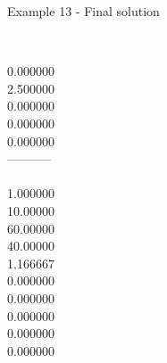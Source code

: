 \begin{frame}{Example 13 - Final solution}
\begin{columns}[t]
\begin{column}{0.3\textwidth}
\\
0.000000\\
2.500000\\
0.000000\\
0.000000\\
0.000000\\
-----------\\
\\
1.000000\\
10.00000\\
60.00000\\
40.00000\\
1.166667\\
0.000000\\
0.000000\\
0.000000\\
0.000000\\
0.000000\\
\end{column}
\end{columns}  
\end{frame}
